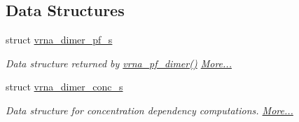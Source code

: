 \subsection*{Data Structures}
\begin{DoxyCompactItemize}
\item 
struct \hyperlink{group__pf__cofold_structvrna__dimer__pf__s}{vrna\+\_\+dimer\+\_\+pf\+\_\+s}
\begin{DoxyCompactList}\small\item\em Data structure returned by \hyperlink{group__pf__cofold_ga4e5c7d06c302a7c59fc0d64dc142ca63}{vrna\+\_\+pf\+\_\+dimer()}  \hyperlink{group__pf__cofold_structvrna__dimer__pf__s}{More...}\end{DoxyCompactList}\item 
struct \hyperlink{group__pf__cofold_structvrna__dimer__conc__s}{vrna\+\_\+dimer\+\_\+conc\+\_\+s}
\begin{DoxyCompactList}\small\item\em Data structure for concentration dependency computations.  \hyperlink{group__pf__cofold_structvrna__dimer__conc__s}{More...}\end{DoxyCompactList}\end{DoxyCompactItemize}
